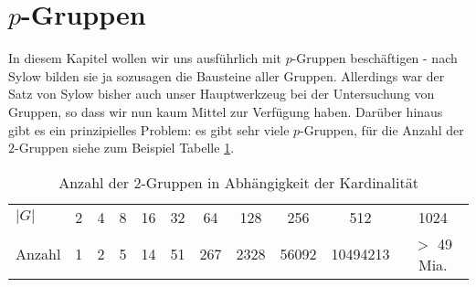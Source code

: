 
%
%

\section{$p$-Gruppen}
In diesem Kapitel wollen wir uns ausf\"uhrlich mit $p$-Gruppen besch\"aftigen - nach Sylow bilden sie ja sozusagen die Bausteine aller Gruppen. Allerdings war der Satz von Sylow bisher auch unser Hauptwerkzeug bei der Untersuchung von Gruppen, so dass wir nun kaum Mittel zur Verf\"ugung haben. Dar\"uber hinaus gibt es ein prinzipielles Problem: es gibt sehr viele $p$-Gruppen, f\"ur die Anzahl der $2$-Gruppen siehe zum Beispiel Tabelle \ref{tab:anzahl 2-gruppen}.
\begin{table}[hbp]
 \begin{tabular}{l|cccccccccc}
$|G|$         &2&4&8&16&32&64 &128 &256  &512     &1024\\
Anzahl&1&2&5&14&51&267&2328&56092&10494213& $>$ 49 Mia.\\
\end{tabular}
\caption{Anzahl der 2-Gruppen in Abh\"angigkeit der Kardinalit\"at}
\label{tab:anzahl 2-gruppen}
 
\end{table}

